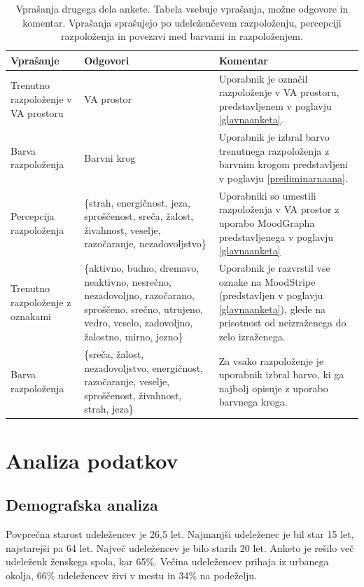 \documentclass[a4paper, 12pt]{book}
\begin{document}
{\begin{table}[H]
\begin{center}
\caption{Vprašanja drugega dela ankete. Tabela vsebuje vprašanja, možne odgovore in komentar. Vprašanja sprašujejo po udeleženčevem razpoloženju, percepciji razpoloženja in povezavi med barvami in razpoloženjem.}
\begin{tabular}{| p{3.5cm} | p{4.5cm} | p{4.5cm} |}
\hline
Vprašanje & Odgovori & Komentar \\ \hline \hline
Trenutno razpoloženje v VA prostoru & VA prostor & Uporabnik je označil razpoloženje v VA prostoru, predstavljenem v poglavju \ref{glavnaanketa}. \\ \hline
Barva razpoloženja & Barvni krog & Uporabnik je izbral barvo trenutnega razpoloženja z barvnim krogom predstavljeni v poglavju \ref{preiliminarnaana}. \\ \hline
Percepcija razpoloženja & \{strah, energičnost, jeza, sproščenost, sreča, žalost, živahnost, veselje, razočaranje, nezadovoljstvo\} & Uporabniki so umestili razpoloženja v VA prostor z uporabo MoodGrapha predstavljenega v poglavju \ref{glavnaanketa} \\ \hline
Trenutno razpoloženje z oznakami & \{aktivno, budno, dremavo, neaktivno, nesrečno, nezadovoljno, razočarano, sproščeno, srečno, utrujeno, vedro, veselo, zadovoljno, žalostno, mirno, jezno\} & Uporabnik je razvrstil vse oznake na MoodStripe (predstavljen v poglavju \ref{glavnaanketa}), glede na prisotnost od neizraženega do zelo izraženega. \\ \hline
Barva razpoloženja & \{sreča, žalost, nezadovoljstvo, energičnost, razočaranje, veselje, sproščenost, živahnost, strah, jeza\} & Za vsako razpoloženje je uporabnik izbral barvo, ki ga najbolj opisuje z uporabo barvnega kroga. \\ \hline

\end{tabular}
\label{drugidel}
\end{center}
\end{table}

\section{Analiza podatkov}

\subsection{Demografska analiza}

Povprečna starost udeležencev je 26,5 let. Najmanjši udeleženec je bil star 15 let, najstarejši pa 64 let. Največ udeležencev je bilo starih 20 let. Anketo je rešilo več udeleženk ženskega spola, kar 65\%. Večina udeležencev prihaja iz urbanega okolja, 66\% udeležencev živi v mestu in 34\% na podeželju.

}
\end{document}
